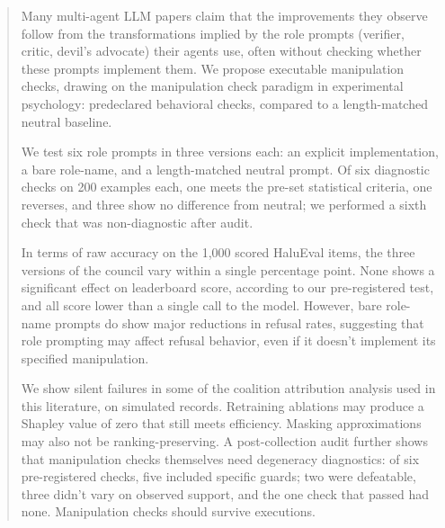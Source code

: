\begin{abstract}
Many multi-agent LLM papers claim that the improvements they observe follow from the
transformations implied by the role prompts (verifier, critic, devil's advocate) their agents
use, often without checking whether these prompts implement them. We propose executable
manipulation checks, drawing on the manipulation check paradigm in experimental psychology:
predeclared behavioral checks, compared to a length-matched neutral baseline.

We test six role prompts in three versions each: an explicit implementation, a bare role-name,
and a length-matched neutral prompt. Of six diagnostic checks on 200 examples each, one meets
the pre-set statistical criteria, one reverses, and three show no difference from neutral; we
performed a sixth check that was non-diagnostic after audit.

In terms of raw accuracy on the 1,000 scored HaluEval items, the three versions of the council
vary within a single percentage point. None shows a significant effect on leaderboard score,
according to our pre-registered test, and all score lower than a single call to the model.
However, bare role-name prompts do show major reductions in refusal rates, suggesting that role
prompting may affect refusal behavior, even if it doesn't implement its specified manipulation.

We show silent failures in some of the coalition attribution analysis used in this literature,
on simulated records. Retraining ablations may produce a Shapley value of zero that still meets
efficiency. Masking approximations may also not be ranking-preserving. A post-collection audit
further shows that manipulation checks themselves need degeneracy diagnostics: of six
pre-registered checks, five included specific guards; two were defeatable, three didn't vary on
observed support, and the one check that passed had none. Manipulation checks should survive
executions.
\end{abstract}
